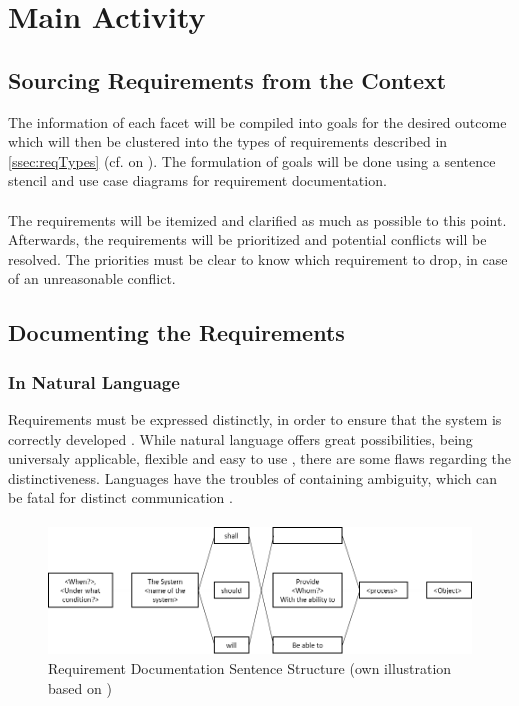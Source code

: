 \section{Main Activity}

\subsection{Sourcing Requirements from the Context}

The information of each facet will be compiled into goals for the desired outcome which will then be clustered into the types of requirements described in \cref{ssec:reqTypes} (cf.  on ). The formulation of goals will be done using a sentence stencil and use case diagrams for requirement documentation. 

\paragraph{} The requirements will be itemized and clarified as much as possible to this point. Afterwards, the requirements will be prioritized and potential conflicts will be resolved. The priorities must be clear to know which requirement to drop, in case of an unreasonable conflict.


\subsection{Documenting the Requirements}

\subsubsection{In Natural Language}
Requirements must be expressed distinctly, in order to ensure that the system is correctly developed \parencites[107]{Ebert.2014}. While natural language offers great possibilities, being universaly applicable, flexible and easy to use \parencite[cf.][239]{Pohl.2007}, there are some flaws regarding the distinctiveness. Languages have the troubles of containing  ambiguity, which can be fatal for distinct communication \parencite[cf.][239-243]{Pohl.2007}.

\paragraph{}
\begin{figure}[H]
    \centering
    \includegraphics[width=\textwidth]{img/SentenceStructure.png}
    \caption[Requirement Documentation Sentence Structure]{Requirement Documentation Sentence Structure (own illustration based on \cite[246]{Pohl.2007})}
    \label{fig:sentencestructure}
\end{figure}

